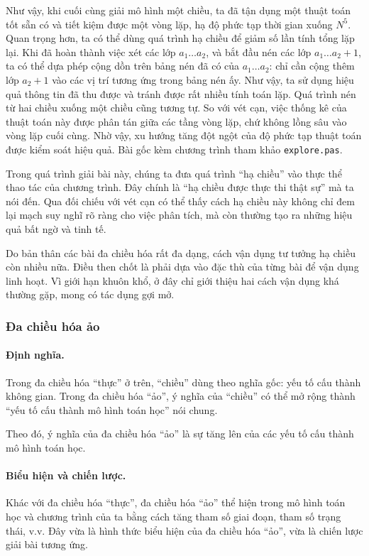\documentclass[11pt]{article}
\begin{document}
Như vậy, khi cuối cùng giải mô hình một chiều, ta đã tận dụng một thuật toán
tốt sẵn có và tiết kiệm được một vòng lặp, hạ độ phức tạp thời gian xuống
\(N^5\). Quan trọng hơn, ta có thể dùng quá trình hạ chiều để giảm số lần tính
tổng lặp lại. Khi đã hoàn thành việc xét các lớp \(a_1\ldots a_2\), và bắt
đầu nén các lớp \(a_1\ldots a_2+1\), ta có thể dựa phép cộng dồn trên bảng
nén đã có của \(a_1\ldots a_2\): chỉ cần cộng thêm lớp \(a_2+1\) vào các vị
trí tương ứng trong bảng nén ấy. Như vậy, ta sử dụng hiệu quả thông tin đã
thu được và tránh được rất nhiều tính toán lặp. Quá trình nén từ hai chiều
xuống một chiều cũng tương tự. So với vét cạn, việc thống kê của thuật toán
này được phân tán giữa các tầng vòng lặp, chứ không lồng sâu vào vòng lặp
cuối cùng. Nhờ vậy, xu hướng tăng đột ngột của độ phức tạp thuật toán được
kiểm soát hiệu quả. Bài gốc kèm chương trình tham khảo \texttt{explore.pas}.

Trong quá trình giải bài này, chúng ta đưa quá trình ``hạ chiều'' vào thực
thể thao tác của chương trình. Đây chính là ``hạ chiều được thực thi thật
sự'' mà ta nói đến. Qua đối chiếu với vét cạn có thể thấy cách hạ chiều này
không chỉ đem lại mạch suy nghĩ rõ ràng cho việc phân tích, mà còn thường tạo
ra những hiệu quả bất ngờ và tinh tế.

Do bản thân các bài đa chiều hóa rất đa dạng, cách vận dụng tư tưởng hạ chiều
còn nhiều nữa. Điều then chốt là phải dựa vào đặc thù của từng bài để vận
dụng linh hoạt. Vì giới hạn khuôn khổ, ở đây chỉ giới thiệu hai cách vận dụng
khá thường gặp, mong có tác dụng gợi mở.

\subsubsection{Đa chiều hóa ảo}

\paragraph{Định nghĩa.}
Trong đa chiều hóa ``thực'' ở trên, ``chiều'' dùng theo nghĩa gốc: yếu tố cấu
thành không gian. Trong đa chiều hóa ``ảo'', ý nghĩa của ``chiều'' có thể mở
rộng thành ``yếu tố cấu thành mô hình toán học'' nói chung.

Theo đó, ý nghĩa của đa chiều hóa ``ảo'' là sự tăng lên của các yếu tố cấu
thành mô hình toán học.

\paragraph{Biểu hiện và chiến lược.}
Khác với đa chiều hóa ``thực'', đa chiều hóa ``ảo'' thể hiện trong mô hình
toán học và chương trình của ta bằng cách tăng tham số giai đoạn, tham số
trạng thái, v.v. Đây vừa là hình thức biểu hiện của đa chiều hóa ``ảo'', vừa
là chiến lược giải bài tương ứng.
\end{document}
